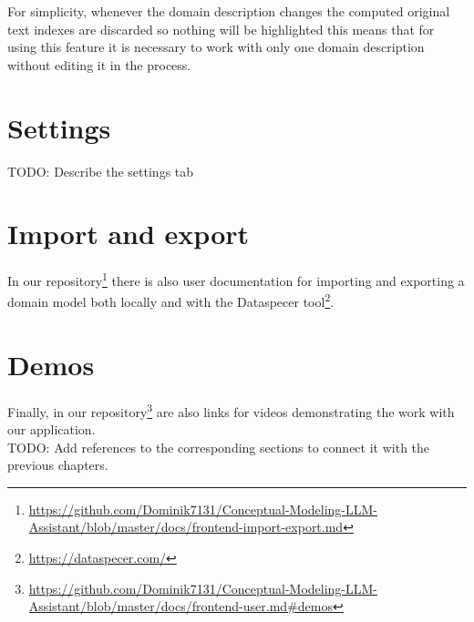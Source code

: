 For simplicity, whenever the domain description changes the computed original text indexes are discarded so nothing will be highlighted this means that for using this feature it is necessary to work with only one domain description without editing it in the process.


\section{Settings}

\noindent{}TODO: Describe the settings tab

\section{Import and export}

In our repository\footnote{\url{https://github.com/Dominik7131/Conceptual-Modeling-LLM-Assistant/blob/master/docs/frontend-import-export.md}} there is also user documentation for importing and exporting a domain model both locally and with the Dataspecer tool\footnote{\url{https://dataspecer.com/}}.

\section{Demos}

Finally, in our repository\footnote{\url{https://github.com/Dominik7131/Conceptual-Modeling-LLM-Assistant/blob/master/docs/frontend-user.md\#demos}} are also links for videos demonstrating the work with our application. \\

\noindent{}TODO: Add references to the corresponding sections to connect it with the previous chapters.